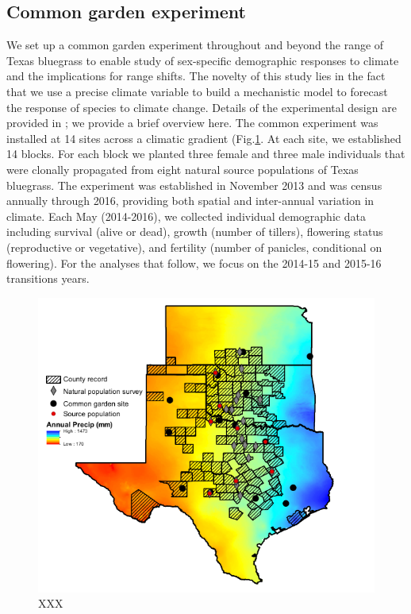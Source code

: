 \documentclass[12pt]{article}
\begin{document}
\subsection*{Common garden experiment}
We set up a common garden experiment throughout and beyond the range of Texas bluegrass to enable study of sex-specific demographic responses to climate and the implications for range shifts. 
The novelty of this study lies in the fact that we use a precise climate variable to build a mechanistic model to forecast the response of species to climate change.
Details of the experimental design are provided in \cite{miller2022two}; we provide a brief overview here. 
The common experiment was installed at 14 sites across a climatic gradient (Fig.\ref{fig:study_design}.
At each site, we established 14 blocks. 
For each block we planted three female and three male individuals that were clonally propagated from eight natural source populations of Texas bluegrass. 
The experiment was established in November 2013 and was census annually through 2016, providing both spatial and inter-annual variation in climate. 
Each May (2014-2016), we collected individual demographic data including survival (alive or dead), growth (number of tillers), flowering status (reproductive or vegetative), and fertility (number of panicles, conditional on flowering). 
For the analyses that follow, we focus on the 2014-15 and 2015-16 transitions years.

\begin{figure}[h!]
  \begin{center}
    \includegraphics[width=0.90\linewidth]{Figures/POAR_BONAP_survey_garden_map.pdf}
  \caption{XXX}
  \label{fig:study_design}
  \end{center}
\end{figure}
\end{document}
